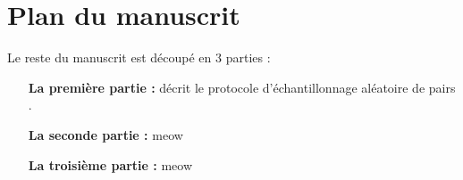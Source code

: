 
\section{Plan du manuscrit}

Le reste du manuscrit est découpé en 3 parties :

\begin{itemize}
\item [\textbf{La première partie :}] décrit le protocole d'échantillonnage
  aléatoire de pairs \SPRAY.
\item [\textbf{La seconde partie :}] meow
\item [\textbf{La troisième partie :}] meow
\end{itemize}



